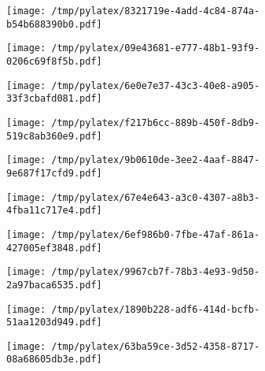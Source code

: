 \documentclass{article}
\begin{document}
\begin{figure}[htbp]
\begin{subfigure}[b]{.3\linewidth}
\texttt{[image: /tmp/pylatex/8321719e-4add-4c84-874a-b54b688390b0.pdf]}
\end{subfigure}
\begin{subfigure}[b]{.3\linewidth}
\texttt{[image: /tmp/pylatex/09e43681-e777-48b1-93f9-0206c69f8f5b.pdf]}
\end{subfigure}
\begin{subfigure}[b]{.3\linewidth}
\texttt{[image: /tmp/pylatex/6e0e7e37-43c3-40e8-a905-33f3cbafd081.pdf]}
\end{subfigure}
\begin{subfigure}[b]{.3\linewidth}
\texttt{[image: /tmp/pylatex/f217b6cc-889b-450f-8db9-519c8ab360e9.pdf]}
\end{subfigure}
\begin{subfigure}[b]{.3\linewidth}
\texttt{[image: /tmp/pylatex/9b0610de-3ee2-4aaf-8847-9e687f17cfd9.pdf]}
\end{subfigure}
\begin{subfigure}[b]{.3\linewidth}
\texttt{[image: /tmp/pylatex/67e4e643-a3c0-4307-a8b3-4fba11c717e4.pdf]}
\end{subfigure}
\begin{subfigure}[b]{.3\linewidth}
\texttt{[image: /tmp/pylatex/6ef986b0-7fbe-47af-861a-427005ef3848.pdf]}
\end{subfigure}
\begin{subfigure}[b]{.3\linewidth}
\texttt{[image: /tmp/pylatex/9967cb7f-78b3-4e93-9d50-2a97baca6535.pdf]}
\end{subfigure}
\begin{subfigure}[b]{.3\linewidth}
\texttt{[image: /tmp/pylatex/1890b228-adf6-414d-bcfb-51aa1203d949.pdf]}
\end{subfigure}
\begin{subfigure}[b]{.3\linewidth}
\texttt{[image: /tmp/pylatex/63ba59ce-3d52-4358-8717-08a68605db3e.pdf]}
\end{subfigure}
\end{figure}
\end{document}
